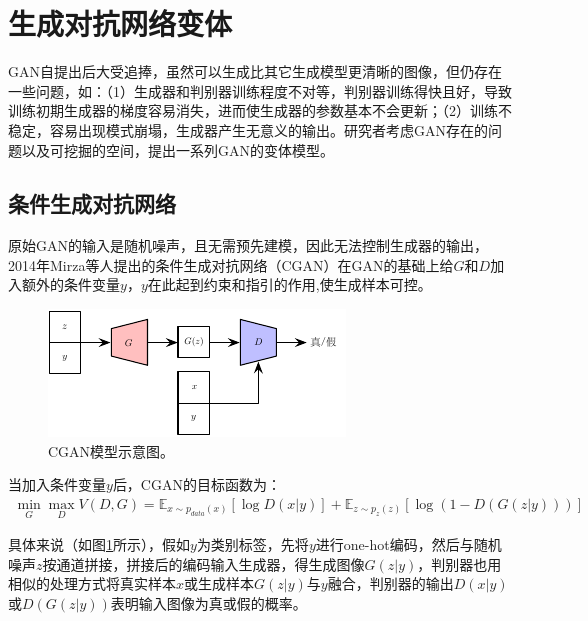 \section{生成对抗网络变体}

GAN自提出后大受追捧，虽然可以生成比其它生成模型更清晰的图像，但仍存在一些问题，如：（1）生成器和判别器训练程度不对等，判别器训练得快且好，导致训练初期生成器的梯度容易消失，进而使生成器的参数基本不会更新；（2）训练不稳定，容易出现模式崩塌，生成器产生无意义的输出。研究者考虑GAN存在的问题以及可挖掘的空间，提出一系列GAN的变体模型。

\subsection{条件生成对抗网络}

原始GAN的输入是随机噪声，且无需预先建模，因此无法控制生成器的输出，2014年Mirza等人\cite{mirza2014conditional}提出的条件生成对抗网络（CGAN）在GAN的基础上给$G$和$D$加入额外的条件变量$y$，$y$在此起到约束和指引的作用,使生成样本可控。

\begin{figure}[ht]
    \centering
	\includegraphics[width=.8\textwidth]{figs/CGAN.pdf}
	\caption{CGAN模型示意图\cite{mirza2014conditional}。}
	\label{CGAN}
\end{figure}

当加入条件变量$y$后，CGAN的目标函数为：
\begin{equation}
\begin{split}
\min \limits_{G} \max \limits_{D} V(D,G) = \mathbb{E}_{x\sim p_{data}(x)}[\log D(x|y)] + \mathbb{E}_{z\sim p_z(z)}[\log(1 - D(G(z|y)))]
\end{split}
\label{eq:CGAN}
\end{equation}

具体来说（如图\ref{CGAN}所示），假如$y$为类别标签，先将$y$进行one-hot编码，然后与随机噪声$z$按通道拼接，拼接后的编码输入生成器，得生成图像$G(z|y)$，判别器也用相似的处理方式将真实样本$x$或生成样本$G(z|y)$与$y$融合，判别器的输出$D(x|y)$或$D(G(z|y))$表明输入图像为真或假的概率。



